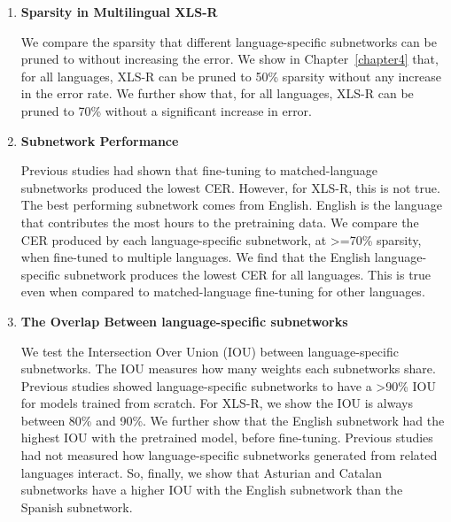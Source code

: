 \begin{enumerate}
    \item \textbf{Sparsity in Multilingual XLS-R}

    We compare the sparsity that different language-specific subnetworks can be pruned to without increasing the error. We show in Chapter~\ref{chapter4} that, for all languages, XLS-R can be pruned to 50\% sparsity without any increase in the error rate. We further show that, for all languages, XLS-R can be pruned to 70\% without a significant increase in error.

    \item \textbf{Subnetwork Performance}
    
    Previous studies had shown that fine-tuning to matched-language subnetworks produced the lowest CER. However, for XLS-R, this is not true. The best performing subnetwork comes from English. English is the language that contributes the most hours to the pretraining data. We compare the CER produced by each language-specific subnetwork, at >=70\% sparsity, when fine-tuned to multiple languages. We find that the English language-specific subnetwork produces the lowest CER for all languages. This is true even when compared to matched-language fine-tuning for other languages. 





    \item \textbf{The Overlap Between language-specific subnetworks}

    We test the Intersection Over Union (IOU) between language-specific subnetworks. The IOU measures how many weights each subnetworks share. Previous studies showed language-specific subnetworks to have a >90\% IOU for models trained from scratch. For XLS-R, we show the IOU is always between 80\% and 90\%. We further show that the English subnetwork had the highest IOU with the pretrained model, before fine-tuning. Previous studies had not measured how language-specific subnetworks generated from related languages interact. So, finally, we show that Asturian and Catalan subnetworks have a higher IOU with the English subnetwork than the Spanish subnetwork.
    
\end{enumerate}

